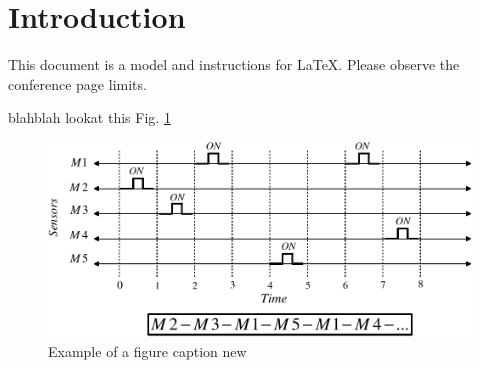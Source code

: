 \section{Introduction}
This document is a model and instructions for \LaTeX.
Please observe the conference page limits. 

blahblah lookat this Fig. \ref{fig-test}

\begin{figure}
\centerline{\includegraphics{figure/pic.pdf}}
\caption{Example of a figure caption new}
\label{fig-test}
\end{figure}
